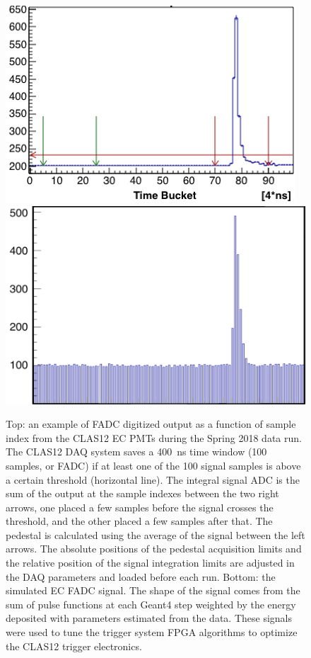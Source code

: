 \begin{figure}
	\centering
	\includegraphics[width=1.00\columnwidth, keepaspectratio]{img/fadcData.png}
    \includegraphics[width=0.99\columnwidth, keepaspectratio]{img/fadcGEMC.png}
    \caption{Top: an example of FADC digitized output as a function of sample index from the CLAS12 EC PMTs
      during the Spring 2018 data run. The CLAS12 DAQ system saves a 400~ns time window (100 samples, or FADC) if
      at least one of the 100 signal samples is above a certain threshold (horizontal line). The integral signal ADC is the
      sum of the output at the sample indexes between the two right arrows, one placed a few samples before the signal
      crosses the threshold, and the other placed a few samples after that. The pedestal is calculated using the average
      of the signal between the left arrows. The absolute positions of the pedestal acquisition limits and the relative
      position of the signal integration limits are adjusted in the DAQ parameters and loaded before each run. Bottom:
      the simulated EC FADC signal. The shape of the signal comes from the sum of pulse functions at each Geant4 step
      weighted by the energy deposited with parameters estimated from the data. These signals were used to tune the
      trigger system FPGA algorithms to optimize the CLAS12 trigger electronics.}
\label{fig:fadcComparison}
\end{figure}

